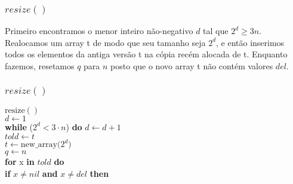 \documentclass{beamer}
\begin{document}
\begin{frame}
\end{frame}

\begin{frame}
\frametitle{$resize()$}
Primeiro encontramos o menor inteiro não-negativo  \ensuremath{\ensuremath{d}} tal que $2^{\ensuremath{\ensuremath{d}}}
\ge 3\ensuremath{\ensuremath{n}}$.  Realocamos um array t de modo que seu tamanho seja $2^{\ensuremath{\ensuremath{d}}}$,
e então inserimos todos os elementos da antiga versão t na cópia recém alocada de t.  Enquanto fazemos, resetamos \ensuremath{\ensuremath{q}} para  \ensuremath{\ensuremath{n}}
posto que o novo array t não contém valores \ensuremath{\ensuremath{\ensuremath{\mathit{del}}}}.

\end{frame}

\begin{frame}
\frametitle{$resize()$}
\begin{oframed}
\begin{flushleft}
\hspace*{1em} \ensuremath{\mathrm{resize}()}\\
\hspace*{1em} \hspace*{1em} \ensuremath{d \gets  1}\\
\hspace*{1em} \hspace*{1em} {\color{black} \textbf{while}} (\ensuremath{2^{d} < 3\cdot n}) {\color{black} \textbf{do}}  \ensuremath{d \gets  \ensuremath{d + 1}}\\
\hspace*{1em} \hspace*{1em} \ensuremath{\ensuremath{\mathit{told}} \gets  t}\\
\hspace*{1em} \hspace*{1em} \ensuremath{t \gets  \ensuremath{\mathrm{new\_array}(2^{d}})}\\
\hspace*{1em} \hspace*{1em} \ensuremath{q \gets  n}\\
\hspace*{1em} \hspace*{1em} {\color{black} \textbf{for}} x {\color{black} \textbf{in}} \ensuremath{told} {\color{black} \textbf{do}} \\
\hspace*{1em} \hspace*{1em} \hspace*{1em} {\color{black} \textbf{if}} \ensuremath{x \ne nil} {\color{black} \textbf{and}} \ensuremath{x \ne \mathit{del}} {\color{black} \textbf{then}} \\

\end{flushleft}
\end{oframed}
\end{frame}
\end{document}
